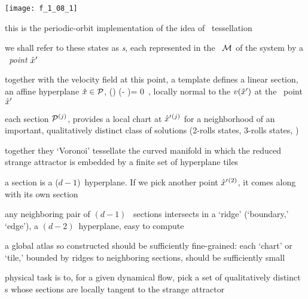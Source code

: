 \begin{frame}{}
\begin{center}
\texttt{[image: f\_1\_08\_1]}
\end{center}
this is the
periodic-orbit implementation of the idea of {\statesp\ tessellation}
\end{frame}

\begin{frame}{}
we shall refer to these states as \emph{\template s}, each represented in
the \statesp\ ${\cal M}$ of the system by a \emph{\template\ point} ${\hat{x}'}$

\medskip

together with the velocity field at this point, a template defines a
linear \Poincare section, an affine hyperplane $\hat{x} \in {\cal P}$,
\beq
    \vel(\slicep) \cdot (\sspRed - \slicep)= 0
\,,
locally normal to the $v({\hat{x}'})$ at the \template\ point ${\hat{x}'}$
\end{frame}

\begin{frame}{}
each \Poincare section ${\cal P}{}^{(j)}$, provides a local chart at
${\hat{x}'}{}^{(j)}$ for a neighborhood of an important, qualitatively
distinct class of solutions (2-rolls states, 3-rolls states, \etc)

\medskip
together they `Voronoi' tessellate  the curved manifold in which the
reduced strange attractor is embedded by a finite set of hyperplane tiles
\end{frame}

\begin{frame}{}
a \Poincare section is a ($d\!-\!1$)\dmn\ hyperplane. If we pick another
{\template} point ${\hat{x}'}{}^{(2)}$, it comes along with its own
\Poincare section
\medskip

any neighboring pair of $(d\!-\!1)$\dmn\ \Poincare
sections intersects in a `ridge' (`boundary,' `edge'), a $(d\!-\!2)$\dmn\
hyperplane, easy to compute
\end{frame}

\begin{frame}{}
a global atlas so constructed should be
sufficiently fine-grained: each `chart' or `tile,' bounded by ridges to
neighboring \Poincare sections, should be sufficiently small

\medskip

physical task is to, for a given dynamical flow, pick a set of
qualitatively distinct {\template s} whose \Poincare sections are locally
tangent to the strange attractor
\end{frame}

